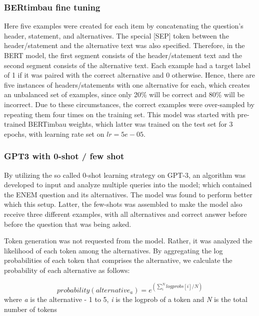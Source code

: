 \documentclass{article}
\begin{document}
\subsubsection{\textbf{BERtimbau fine tuning}}

Here five examples were created for each item by concatenating the question's header, statement, and alternatives. The special [SEP] token between the header/statement and the alternative text was also specified. Therefore, in the BERT model, the first segment consists of the header/statement text and the second segment consists of the alternative text. Each example had a target label of 1 if it was paired with the correct alternative and 0 otherwise. Hence, there are five instances of headers/statements with one alternative for each, which creates an unbalanced set of examples, since only 20\% will be correct and 80\% will be incorrect. Due to these circumstances, the correct examples were over-sampled by repeating them four times on the training set. This model was started with pre-trained BERTimbau weights, which latter was trained on the test set for 3 epochs, with learning rate set on $lr = 5e-05$.

\subsubsection{\textbf{GPT3 with 0-shot / few shot}}

By utilizing the so called 0-shot learning strategy on GPT-3, an algorithm was developed to input and analyze multiple queries into the model; which contained the ENEM question and its alternatives. The model was found to perform better which this setup. Latter, the few-shots was assembled to make the model also receive three different examples, with all alternatives and correct answer before before the question that was being asked.

Token generation was not requested from the model. Rather, it was analyzed the likelihood of each token among the alternatives. By aggregating the log probabilities of each token that comprises the alternative, we calculate the probability of each alternative as follows: 

\begin{equation} \label{eq1}
probability(alternative_{a}) = e^{\left(\sum_{i}^{N} logprobs[i]/N\right)}
\end{equation}
where \textit{a} is the alternative - 1 to 5, \textit{i} is the logprob of a token and \textit{N} is the total number of tokens
\end{document}

